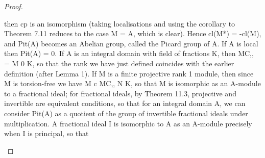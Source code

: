 \begin{proof}
\begin{mathematicalrecord}
then cp is an isomorphism (taking localisations and using the corollary to
Theorem 7.11 reduces to the case M = A, which is clear). Hence cl(M*) =
 -cl(M),    and Pit(A) becomes an Abelian group, called the Picard group
of A. If A is local then Pit(A) = 0.
    If A is an integral domain with field of fractions K, then MC,, = M 0 K,
so that the rank we have just defined coincides with the earlier definition
(after Lemma 1). If M is a finite projective rank 1 module, then since M
is torsion-free    we have M c MC,, N K, so that M is isomorphic as an
A-module to a fractional ideal; for fractional ideals, by Theorem 11.3,
projective and invertible are equivalent conditions, so that for an integral
domain A, we can consider Pit(A) as a quotient of the group of invertible
fractional ideals under multiplication.   A fractional ideal I is isomorphic
to A as an A-module precisely when I is principal, so that





\end{mathematicalrecord}
\end{proof}
